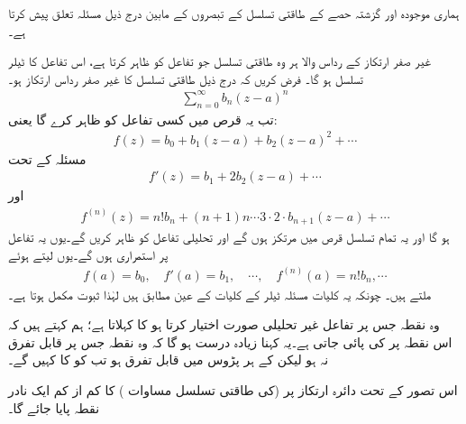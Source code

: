 ہماری موجودہ اور گزشتہ حصے کے  طاقتی تسلسل کے تبصروں کے مابین درج ذیل مسئلہ تعلق پیش کرتا ہے۔

غیر صفر ارتکاز کے رداس والا ہر وہ طاقتی تسلسل جو تفاعل کو ظاہر کرتا ہے، اس تفاعل کا ٹیلر تسلسل ہو گا۔ 
\quad
فرض کریں کہ درج ذیل طاقتی تسلسل کا غیر صفر رداس ارتکاز  ہو۔
\begin{align*}
\sum\limits_{n=0}^{\infty}b_n(z-a)^n
\end{align*}
تب یہ قرص  میں کسی تفاعل  کو ظاہر کرے گا یعنی:
\begin{align*}
f(z)=b_0+b_1(z-a)+b_2(z-a)^2+\cdots
\end{align*}
مسئلہ  کے تحت
\begin{align*}
f'(z)=b_1+2b_2(z-a)+\cdots
\end{align*}
اور
\begin{align*}
f^{(n)}(z)=n!b_n+(n+1)n\cdots 3\cdot 2\cdot b_{n+1}(z-a)+\cdots
\end{align*}
ہو گا اور یہ تمام تسلسل قرص  میں مرتکز ہوں گے اور تحلیلی تفاعل کو ظاہر کریں گے۔یوں یہ تفاعل  پر استمراری  ہوں گے۔یوں  لیتے ہوئے 
\begin{align*}
f(a)=b_0,\quad f'(a)=b_1,\quad \cdots,\quad f^{(n)}(a)=n!b_n,\cdots
\end{align*}
ملتے ہیں۔ چونکہ یہ کلیات مسئلہ ٹیلر  کے کلیات کے  عین مطابق ہیں لہٰذا ثبوت مکمل ہوتا ہے۔

وہ نقطہ جس پر تفاعل  غیر تحلیلی صورت اختیار کرتا ہو  کا  کہلاتا ہے؛ ہم کہتے ہیں کہ اس نقطہ پر  کی  پائی جاتی ہے۔یہ کہنا زیادہ درست ہو گا کہ وہ نقطہ  جس پر  قابل تفرق نہ ہو لیکن  کے ہر پڑوس میں  قابل تفرق ہو تب  کو  کا  کہیں گے۔ 

اس تصور کے تحت دائرہ ارتکاز پر  (کی طاقتی تسلسل مساوات ) کا کم از کم ایک نادر نقطہ پایا جائے گا۔ 

